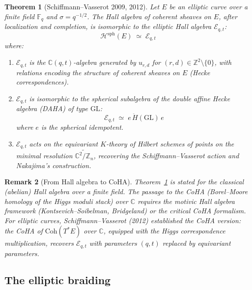 \documentclass[11pt]{article}
\theoremstyle{garamondthm}
\newtheorem{theorem}{Theorem}[section]
\theoremstyle{garamonddef}
\theoremstyle{garamondrem}
\newtheorem{remark}[theorem]{Remark}
\newcommand{\Coh}{\mathrm{Coh}}
\newcommand{\cE}{\mathcal{E}}
\newcommand{\cH}{\mathcal{H}}
\newcommand{\GL}{\mathrm{GL}}
\begin{document}
\begin{theorem}[Schiffmann--Vasserot 2009, 2012]
\label{thm:sv-elliptic}
Let $E$ be an elliptic curve over a finite field $\mathbb{F}_q$ and $\sigma = q^{-1/2}$. The Hall algebra of coherent sheaves on $E$, after localization and completion, is isomorphic to the \emph{elliptic Hall algebra} $\cE_{q,t}$:
\[
 \cH^{\mathrm{sph}}(E) \;\simeq\; \cE_{q,t}
\]
where:
\begin{enumerate}[label=(\roman*)]
 \item $\cE_{q,t}$ is the $\mathbb{C}(q,t)$-algebra generated by $u_{r,d}$ for $(r,d) \in \mathbb{Z}^2 \setminus \{0\}$, with relations encoding the structure of coherent sheaves on $E$ (Hecke correspondences).
 \item $\cE_{q,t}$ is isomorphic to the \emph{spherical subalgebra} of the \emph{double affine Hecke algebra} (DAHA) of type $\GL$:
 \[
 \cE_{q,t} \;\simeq\; e \, \ddot{H}(\GL) \, e
 \]
 where $e$ is the spherical idempotent.
 \item $\cE_{q,t}$ acts on the equivariant $K$-theory of Hilbert schemes of points on the minimal resolution $\widetilde{\mathbb{C}^2/\mathbb{Z}_n}$, recovering the Schiffmann--Vasserot action and Nakajima's construction.
\end{enumerate}
\end{theorem}

\begin{remark}[From Hall algebra to CoHA]
\label{rem:hall-to-coha}
Theorem~\ref{thm:sv-elliptic} is stated for the classical (abelian) Hall algebra over a finite field. The passage to the CoHA (Borel--Moore homology of the Higgs moduli stack) over $\mathbb{C}$ requires the motivic Hall algebra framework (Kontsevich--Soibelman, Bridgeland) or the critical CoHA formalism. For elliptic curves, Schiffmann--Vasserot (2012) established the CoHA version: the CoHA of $\Coh(T^*E)$ over $\mathbb{C}$, equipped with the Higgs correspondence multiplication, recovers $\cE_{q,t}$ with parameters $(q,t)$ replaced by equivariant parameters.
\end{remark}

\subsection{The elliptic braiding}
\label{ssec:elliptic-braiding}
\end{document}
